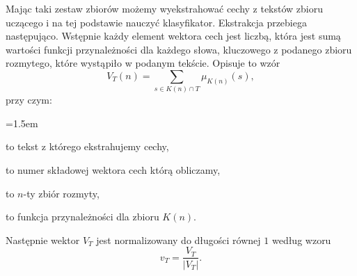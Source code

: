 \documentclass[a4paper]{classrep}
\begin{document}
Mając taki zestaw zbiorów możemy wyekstrahować cechy z tekstów zbioru uczącego i na tej podstawie nauczyć klasyfikator. Ekstrakcja przebiega następująco. Wstępnie każdy element wektora
cech jest liczbą, która jest sumą wartości funkcji przynależności dla każdego słowa, kluczowego z podanego zbioru rozmytego, które wystąpiło w podanym tekście.
Opisuje to wzór
\begin{equation}
V_T(n)=\sum_{s\in K(n) \cap T} \mu_{K(n)}(s),
\end{equation}
przy czym:
{
\begin{description}
\leftskip=1.5em
\item [\(T\)] to tekst z którego ekstrahujemy cechy,
\item [\(n\)] to numer składowej wektora cech którą obliczamy,
\item [\(K(n)\)] to \(n\)-ty zbiór rozmyty,
\item [\(\mu_{K(n)}(s)\)] to funkcja przynależności dla zbioru \(K(n)\).
\end{description}
}
\noindent Następnie wektor \(V_T\) jest normalizowany do długości równej \(1\) według wzoru
\begin{equation}
v_T = \frac{V_T}{|V_T|}.
\end{equation}
\end{document}
